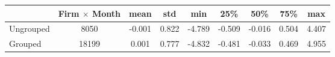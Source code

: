 \begin{tabular}{lcccccccc}
\toprule
{} &  Firm $ \times $ Month &   mean &    std &    min &    25\% &    50\% &    75\% &    max \\
\midrule
Ungrouped &                8050 & -0.001 &  0.822 & -4.789 & -0.509 & -0.016 &  0.504 &  4.407 \\
Grouped   &               18199 &  0.001 &  0.777 & -4.832 & -0.481 & -0.033 &  0.469 &  4.955 \\
\bottomrule
\end{tabular}
